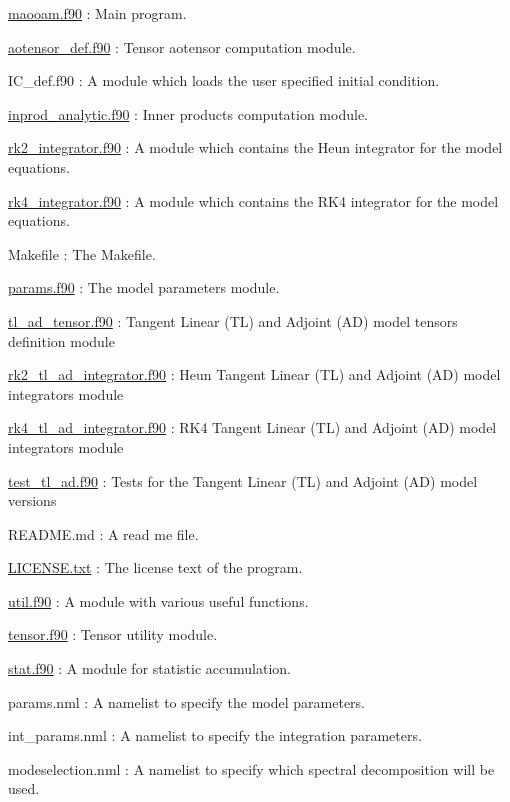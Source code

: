 \begin{DoxyItemize}
\item \hyperlink{maooam_8f90}{maooam.\+f90} \+: Main program.
\item \hyperlink{aotensor__def_8f90}{aotensor\+\_\+def.\+f90} \+: Tensor aotensor computation module.
\item I\+C\+\_\+def.\+f90 \+: A module which loads the user specified initial condition.
\item \hyperlink{inprod__analytic_8f90}{inprod\+\_\+analytic.\+f90} \+: Inner products computation module.
\item \hyperlink{rk2__integrator_8f90}{rk2\+\_\+integrator.\+f90} \+: A module which contains the Heun integrator for the model equations.
\item \hyperlink{rk4__integrator_8f90}{rk4\+\_\+integrator.\+f90} \+: A module which contains the R\+K4 integrator for the model equations.
\item Makefile \+: The Makefile.
\item \hyperlink{params_8f90}{params.\+f90} \+: The model parameters module.
\item \hyperlink{tl__ad__tensor_8f90}{tl\+\_\+ad\+\_\+tensor.\+f90} \+: Tangent Linear (TL) and Adjoint (AD) model tensors definition module
\item \hyperlink{rk2__tl__ad__integrator_8f90}{rk2\+\_\+tl\+\_\+ad\+\_\+integrator.\+f90} \+: Heun Tangent Linear (TL) and Adjoint (AD) model integrators module
\item \hyperlink{rk4__tl__ad__integrator_8f90}{rk4\+\_\+tl\+\_\+ad\+\_\+integrator.\+f90} \+: R\+K4 Tangent Linear (TL) and Adjoint (AD) model integrators module
\item \hyperlink{test__tl__ad_8f90}{test\+\_\+tl\+\_\+ad.\+f90} \+: Tests for the Tangent Linear (TL) and Adjoint (AD) model versions
\item R\+E\+A\+D\+M\+E.\+md \+: A read me file.
\item \hyperlink{LICENSE_8txt}{L\+I\+C\+E\+N\+S\+E.\+txt} \+: The license text of the program.
\item \hyperlink{util_8f90}{util.\+f90} \+: A module with various useful functions.
\item \hyperlink{tensor_8f90}{tensor.\+f90} \+: Tensor utility module.
\item \hyperlink{stat_8f90}{stat.\+f90} \+: A module for statistic accumulation.
\item params.\+nml \+: A namelist to specify the model parameters.
\item int\+\_\+params.\+nml \+: A namelist to specify the integration parameters.
\item modeselection.\+nml \+: A namelist to specify which spectral decomposition will be used.
\end{DoxyItemize}





